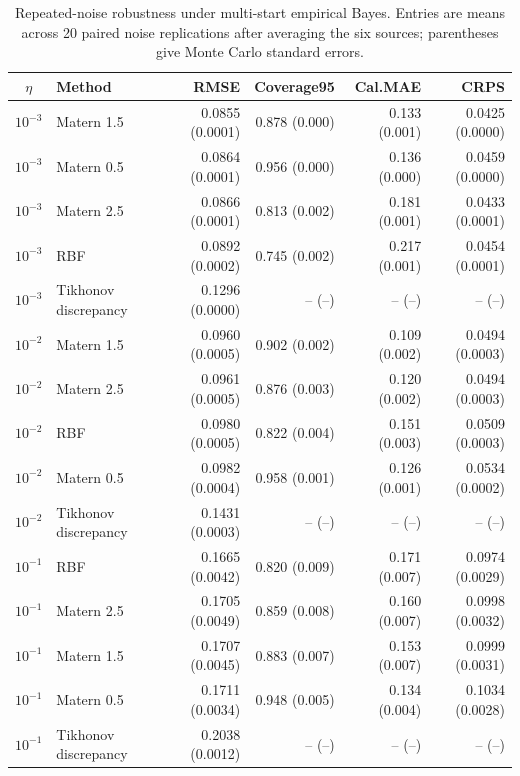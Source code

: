 \begin{table}[H]
\centering
\caption{Repeated-noise robustness under multi-start empirical Bayes. Entries are means across 20 paired noise replications after averaging the six sources; parentheses give Monte Carlo standard errors.}
\label{tab:repeated-noise}
\small
\begin{tabular}{clrrrr}
\toprule
$\eta$ & Method & RMSE & Coverage95 & Cal.MAE & CRPS\\
\midrule
$10^{-3}$ & Matern 1.5 & 0.0855 (0.0001) & 0.878 (0.000) & 0.133 (0.001) & 0.0425 (0.0000)\\
$10^{-3}$ & Matern 0.5 & 0.0864 (0.0001) & 0.956 (0.000) & 0.136 (0.000) & 0.0459 (0.0000)\\
$10^{-3}$ & Matern 2.5 & 0.0866 (0.0001) & 0.813 (0.002) & 0.181 (0.001) & 0.0433 (0.0001)\\
$10^{-3}$ & RBF & 0.0892 (0.0002) & 0.745 (0.002) & 0.217 (0.001) & 0.0454 (0.0001)\\
$10^{-3}$ & Tikhonov discrepancy & 0.1296 (0.0000) & -- (--) & -- (--) & -- (--)\\
\addlinespace
$10^{-2}$ & Matern 1.5 & 0.0960 (0.0005) & 0.902 (0.002) & 0.109 (0.002) & 0.0494 (0.0003)\\
$10^{-2}$ & Matern 2.5 & 0.0961 (0.0005) & 0.876 (0.003) & 0.120 (0.002) & 0.0494 (0.0003)\\
$10^{-2}$ & RBF & 0.0980 (0.0005) & 0.822 (0.004) & 0.151 (0.003) & 0.0509 (0.0003)\\
$10^{-2}$ & Matern 0.5 & 0.0982 (0.0004) & 0.958 (0.001) & 0.126 (0.001) & 0.0534 (0.0002)\\
$10^{-2}$ & Tikhonov discrepancy & 0.1431 (0.0003) & -- (--) & -- (--) & -- (--)\\
\addlinespace
$10^{-1}$ & RBF & 0.1665 (0.0042) & 0.820 (0.009) & 0.171 (0.007) & 0.0974 (0.0029)\\
$10^{-1}$ & Matern 2.5 & 0.1705 (0.0049) & 0.859 (0.008) & 0.160 (0.007) & 0.0998 (0.0032)\\
$10^{-1}$ & Matern 1.5 & 0.1707 (0.0045) & 0.883 (0.007) & 0.153 (0.007) & 0.0999 (0.0031)\\
$10^{-1}$ & Matern 0.5 & 0.1711 (0.0034) & 0.948 (0.005) & 0.134 (0.004) & 0.1034 (0.0028)\\
$10^{-1}$ & Tikhonov discrepancy & 0.2038 (0.0012) & -- (--) & -- (--) & -- (--)\\
\bottomrule
\end{tabular}
\end{table}
